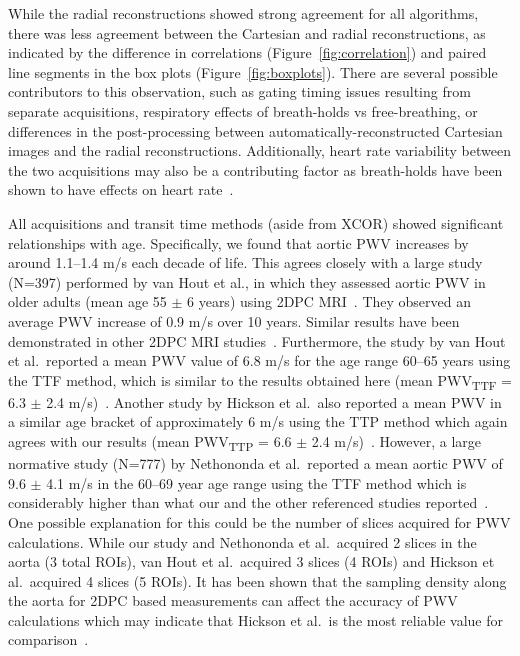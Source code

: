 While the radial reconstructions showed strong agreement for all algorithms, there was less agreement between the Cartesian and radial reconstructions, as indicated by the difference in correlations (Figure~\ref{fig:correlation}) and paired line segments in the box plots (Figure~\ref{fig:boxplots}). There are several possible contributors to this observation, such as gating timing issues resulting from separate acquisitions, respiratory effects of breath-holds vs free-breathing, or differences in the post-processing between automatically-reconstructed Cartesian images and the radial reconstructions. Additionally, heart rate variability between the two acquisitions may also be a contributing factor as breath-holds have been shown to have effects on heart rate~\cite{hassanEffectNormalBreathing2021a}.

All acquisitions and transit time methods (aside from XCOR) showed significant relationships with age. Specifically, we found that aortic PWV increases by around 1.1--1.4 m/s each decade of life. This agrees closely with a large study (N=397) performed by van Hout et al., in which they assessed aortic PWV in older adults (mean age 55 $\pm$ 6 years) using 2DPC MRI~\cite{vanhoutNormalReferenceValues2021}. They observed an average PWV increase of 0.9 m/s over 10 years. Similar results have been demonstrated in other 2DPC MRI studies~\cite{dyverfeldtPulseWaveVelocity2014,parikhMeasurementPulseWave2016, hicksonRelationshipAgeRegional2010}. Furthermore, the study by van Hout et al.\ reported a mean PWV value of 6.8 m/s for the age range 60--65 years using the TTF method, which is similar to the results obtained here (mean PWV\textsubscript{TTF} = 6.3 $\pm$ 2.4 m/s)~\cite{vanhoutNormalReferenceValues2021}. Another study by Hickson et al.\ also reported a mean PWV in a similar age bracket of approximately 6 m/s using the TTP method which again agrees with our results (mean PWV\textsubscript{TTP} = 6.6 $\pm$ 2.4 m/s)~\cite{hicksonRelationshipAgeRegional2010}. However, a large normative study (N=777) by Nethononda et al.\ reported a mean aortic PWV of 9.6 $\pm$ 4.1 m/s in the 60--69 year age range using the TTF method which is considerably higher than what our and the other referenced studies reported~\cite{nethonondaGenderSpecificPatterns2015}. One possible explanation for this could be the number of slices acquired for PWV calculations. While our study and Nethononda et al.\ acquired 2 slices in the aorta (3 total ROIs), van Hout et al.\ acquired 3 slices (4 ROIs) and Hickson et al.\ acquired 4 slices (5 ROIs). It has been shown that the sampling density along the aorta for 2DPC based measurements can affect the accuracy of PWV calculations which may indicate that Hickson et al.\ is the most reliable value for comparison~\cite{kronerEvaluationSamplingDensity2012}.

